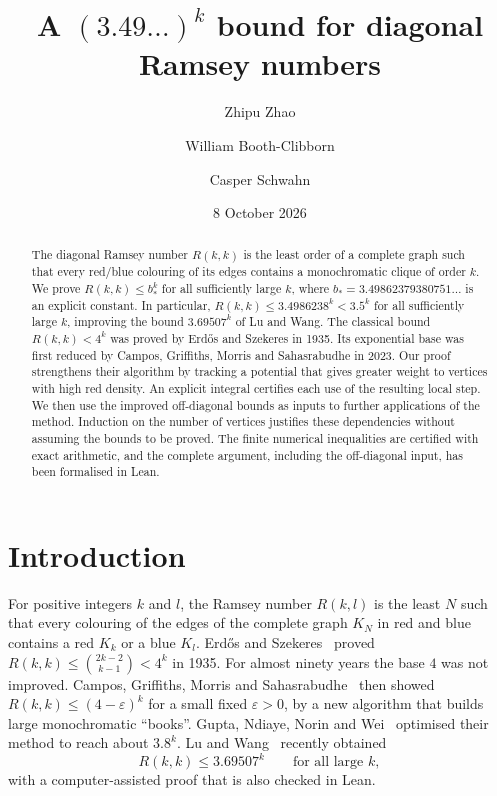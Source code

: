 \documentclass[11pt]{article}
\title{A $(3.49\ldots)^k$ bound for diagonal Ramsey numbers}
\author{Zhipu Zhao \and William Booth-Clibborn \and Casper Schwahn}
\date{8 October 2026}
\theoremstyle{definition}
\theoremstyle{remark}
\begin{document}
\maketitle

\begin{abstract}
The diagonal Ramsey number $R(k,k)$ is the least order of a complete graph such that every red/blue colouring
of its edges contains a monochromatic clique of order $k$. We prove $R(k,k)\le b_*^k$ for all sufficiently large $k$,
where $b_*=3.49862379380751\ldots$ is an explicit constant. In particular, $R(k,k)\le3.4986238^k<3.5^k$ for all sufficiently
large $k$, improving the bound $3.69507^k$ of Lu and Wang. The classical bound $R(k,k)<4^k$ was proved by
Erd\H{o}s and Szekeres in 1935. Its exponential base was first reduced by Campos, Griffiths, Morris and
Sahasrabudhe in 2023. Our proof strengthens their algorithm by tracking a potential that gives greater
weight to vertices with high red density. An explicit integral certifies each use of the resulting local step.
We then use the improved off-diagonal bounds as inputs to further applications of the method.
Induction on the number of vertices justifies these dependencies without assuming the bounds to be proved.
The finite numerical inequalities are certified with exact arithmetic, and the complete argument, including
the off-diagonal input, has been formalised in Lean.
\end{abstract}

\setcounter{tocdepth}{1}
\tableofcontents
\clearpage

\section{Introduction}

For positive integers $k$ and $l$, the Ramsey number $R(k,l)$ is the least $N$ such that every colouring of the edges
of the complete graph $K_N$ in red and blue contains a red $K_k$ or a blue $K_l$. Erd\H{o}s and Szekeres~\cite{ES}
proved $R(k,k)\le\binom{2k-2}{k-1}<4^k$ in 1935. For almost ninety years the base $4$ was not improved. Campos,
Griffiths, Morris and Sahasrabudhe~\cite{CGMS} then showed $R(k,k)\le(4-\varepsilon)^k$ for a small fixed
$\varepsilon>0$, by a new algorithm that builds large monochromatic ``books''. Gupta, Ndiaye, Norin and Wei~\cite{GNNW}
optimised their method to reach about $3.8^k$. Lu and Wang~\cite{LW} recently obtained
\[
R(k,k)\le 3.69507^k\qquad\text{for all large }k,
\]
with a computer-assisted proof that is also checked in Lean.
\end{document}
